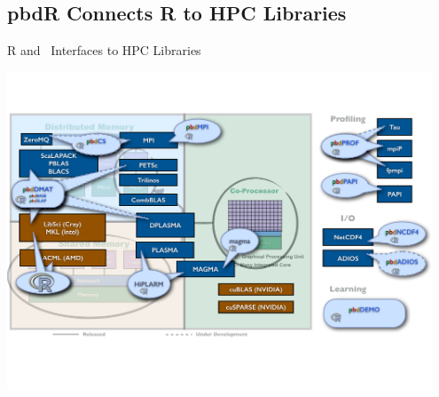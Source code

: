 \subsection{pbdR Connects R to HPC Libraries}
\makesubcontentsslidessec


\begin{frame}
\begin{block}{R and \pbdR\ Interfaces to HPC Libraries}
    
\includegraphics[width=0.95\textwidth]
{../common/pics/hardware/ParallelHardware14.pdf}
\end{block}
\end{frame}

